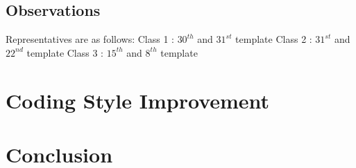 \documentclass[a4paper]{article}
\begin{document}
\subsection{Observations}

Representatives are as follows:\newline
Class 1 : $30^{th}$ and $31^{st}$ template\newline
Class 2 : $31^{st}$ and $22^{nd}$ template\newline
Class 3 : $15^{th}$ and $8^{th}$ template
\newpage
\section{Coding Style Improvement}

\section{Conclusion}

\end{document}
